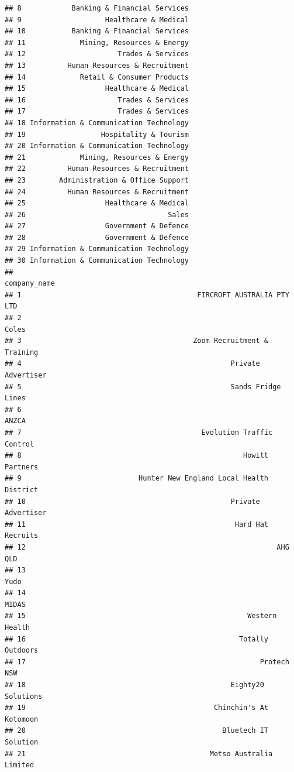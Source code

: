 \documentclass[11pt,a4paper,]{article}
\begin{document}
\begin{verbatim}
## 8            Banking & Financial Services
## 9                    Healthcare & Medical
## 10           Banking & Financial Services
## 11             Mining, Resources & Energy
## 12                      Trades & Services
## 13          Human Resources & Recruitment
## 14             Retail & Consumer Products
## 15                   Healthcare & Medical
## 16                      Trades & Services
## 17                      Trades & Services
## 18 Information & Communication Technology
## 19                  Hospitality & Tourism
## 20 Information & Communication Technology
## 21             Mining, Resources & Energy
## 22          Human Resources & Recruitment
## 23        Administration & Office Support
## 24          Human Resources & Recruitment
## 25                   Healthcare & Medical
## 26                                  Sales
## 27                   Government & Defence
## 28                   Government & Defence
## 29 Information & Communication Technology
## 30 Information & Communication Technology
##                                                          company_name
## 1                                          FIRCROFT AUSTRALIA PTY LTD
## 2                                                               Coles
## 3                                         Zoom Recruitment & Training
## 4                                                  Private Advertiser
## 5                                                  Sands Fridge Lines
## 6                                                               ANZCA
## 7                                           Evolution Traffic Control
## 8                                                     Howitt Partners
## 9                            Hunter New England Local Health District
## 10                                                 Private Advertiser
## 11                                                  Hard Hat Recruits
## 12                                                            AHG QLD
## 13                                                               Yudo
## 14                                                              MIDAS
## 15                                                     Western Health
## 16                                                   Totally Outdoors
## 17                                                        Protech NSW
## 18                                                 Eighty20 Solutions
## 19                                             Chinchin's At Kotomoon
## 20                                               Bluetech IT Solution
## 21                                            Metso Australia Limited

\end{verbatim}
\end{document}
